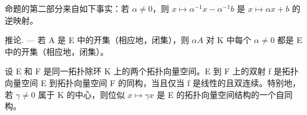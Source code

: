 命题的第二部分来自如下事实：若 \(\alpha \neq 0\)，则 \(x \mapsto \alpha^{-1}x - \alpha^{-1}b\) 是 \(x \mapsto \alpha x + b\) 的逆映射。

推论. --- 若 A 是 E 中的开集（相应地，闭集），则 \(\alpha A\) 对 K 中每个 \(\alpha \neq 0\) 都是 E 中的开集（相应地，闭集）。

设 E 和 F 是同一拓扑除环 K 上的两个拓扑向量空间。E 到 F 上的双射 f 是拓扑向量空间 E 到拓扑向量空间 F 的同构，当且仅当 f 是线性的且双连续。特别地，若 \(\gamma \neq 0\) 属于 K 的中心，则位似 \(x \mapsto \gamma x\) 是 E 的拓扑向量空间结构的一个自同构。

